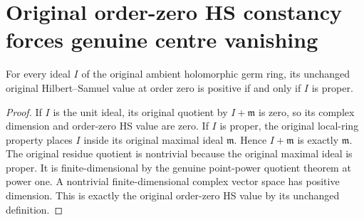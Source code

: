 \section{Original order-zero HS constancy forces genuine centre vanishing}

\begin{theorem}
\label{hir:actual-original-hs-zero-positive-iff-proper}
\leanok
For every ideal $I$ of the original ambient holomorphic germ ring,
its unchanged original Hilbert--Samuel value at order zero is positive
if and only if $I$ is proper.
\end{theorem}
\begin{proof}
If $I$ is the unit ideal, its original quotient by $I+\mathfrak m$ is
zero, so its complex dimension and order-zero HS value are zero.
If $I$ is proper, the original local-ring property places $I$ inside
its original maximal ideal $\mathfrak m$. Hence $I+\mathfrak m$ is
exactly $\mathfrak m$. The original residue quotient is nontrivial
because the original maximal ideal is proper. It is finite-dimensional
by the genuine point-power quotient theorem at power one. A nontrivial
finite-dimensional complex vector space has positive dimension. This
is exactly the original order-zero HS value by its unchanged definition.
\end{proof}

